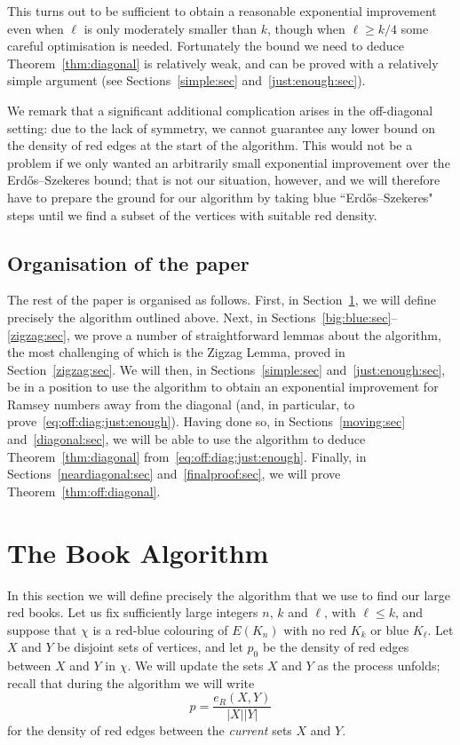 \documentclass[12pt,reqno]{amsart}
\theoremstyle{definition}
\theoremstyle{remark}
\renewcommand{\le}{\leqslant}
\renewcommand{\ge}{\geqslant}
\begin{document}
This turns out to be sufficient to obtain a reasonable exponential improvement even when $\ell$ is only moderately smaller than $k$, though when $\ell \ge k/4$ some careful optimisation is needed. Fortunately the bound we need to deduce Theorem~\ref{thm:diagonal} is relatively weak, and can be proved with a relatively simple argument (see Sections~\ref{simple:sec} and~\ref{just:enough:sec}). 

We remark that a significant additional complication arises in the off-diagonal setting: due to the lack of symmetry, we cannot guarantee any lower bound on the density of red edges at the start of the algorithm. This would not be a problem if we only wanted an arbitrarily small exponential improvement over the Erd\H{o}s--Szekeres bound; that is not our situation, however, and we will therefore have to prepare the ground for our algorithm by taking blue ``Erd\H{o}s--Szekeres" steps until we find a subset of the vertices with suitable red density. 


\subsection{Organisation of the paper}

The rest of the paper is organised as follows. First, in Section~\ref{book:alg:sec}, we will define precisely the algorithm outlined above. Next, in Sections~\ref{big:blue:sec}--\ref{zigzag:sec}, we prove a number of straightforward lemmas about the algorithm, the most challenging of which is the Zigzag Lemma, proved in Section~\ref{zigzag:sec}. We will then, in Sections~\ref{simple:sec} and~\ref{just:enough:sec}, be in a position to use the algorithm to obtain an exponential improvement for Ramsey numbers away from the diagonal (and, in particular, to prove~\eqref{eq:off:diag:just:enough}). %
Having done so, in Sections~\ref{moving:sec} and~\ref{diagonal:sec}, we will be able to use the algorithm to deduce Theorem~\ref{thm:diagonal} from~\eqref{eq:off:diag:just:enough}. Finally, in Sections~\ref{neardiagonal:sec} and~\ref{finalproof:sec}, we will prove Theorem~\ref{thm:off:diagonal}. 


\section{The Book Algorithm}\label{book:alg:sec}

In this section we will define precisely the algorithm that we use to find our large red books. Let us fix sufficiently large integers $n$, $k$ and $\ell$, with $\ell \le k$, and suppose that $\chi$ is a red-blue colouring of $E(K_n)$ with no red $K_k$ or blue $K_\ell$. Let $X$ and $Y$ be disjoint sets of vertices, and let $p_0$ be the density of red edges between $X$ and $Y$ in $\chi$. 
We will update the sets $X$ and $Y$ as the process unfolds; recall that during the algorithm we will write 
$$p = \frac{e_R(X,Y)}{|X||Y|}$$
for the density of red edges between the \emph{current} sets $X$ and $Y$. 
\end{document}
